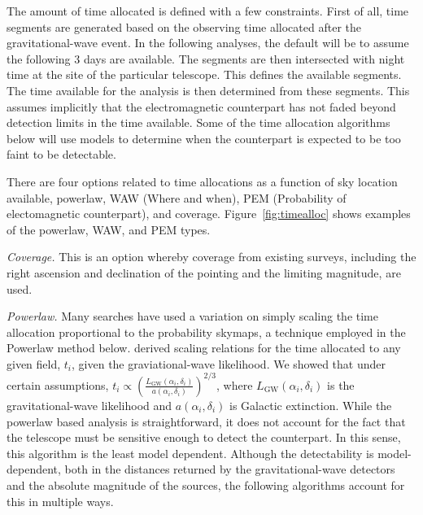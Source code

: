 \documentclass[twocolumn]{aastex61}
\begin{document}
The amount of time allocated is defined with a few constraints. 
First of all, time segments are generated based on the observing time allocated after the gravitational-wave event. 
In the following analyses, the default will be to assume the following 3 days are available.
The segments are then intersected with night time at the site of the particular telescope.
This defines the available segments. 
The time available for the analysis is then determined from these segments.
This assumes implicitly that the electromagnetic counterpart has not faded beyond detection limits in the time available. Some of the time allocation algorithms below will use models to determine when the counterpart is expected to be too faint to be detectable.

There are four options related to time allocations as a function of sky location available, powerlaw, WAW (Where and when), PEM (Probability of electomagnetic counterpart), and coverage. Figure~\ref{fig:timealloc} shows examples of the powerlaw, WAW, and PEM types.

\emph{Coverage.} This is an option whereby coverage from existing surveys, including the right ascension and declination of the pointing and the limiting magnitude, are used.

\emph{Powerlaw.} Many searches have used a variation on simply scaling the time allocation proportional to the probability skymaps, a technique employed in the Powerlaw method below. \cite{CoSt2016a} derived scaling relations for the time allocated to any given field, $t_i$, given the graviational-wave likelihood. We showed that under certain assumptions, $t_i \propto \left(\frac{L_\textrm{GW}(\alpha_i,\delta_i)}{a(\alpha_i,\delta_i)}\right)^{2/3}$, where $L_\textrm{GW}(\alpha_i,\delta_i)$ is the gravitational-wave likelihood and $a(\alpha_i,\delta_i)$ is Galactic extinction.  While the powerlaw based analysis is straightforward, it does not account for the fact that the telescope must be sensitive enough to detect the counterpart. In this sense, this algorithm is the least model dependent. Although the detectability is model-dependent, both in the distances returned by the gravitational-wave detectors and the absolute magnitude of the sources, the following algorithms account for this in multiple ways.
\end{document}
